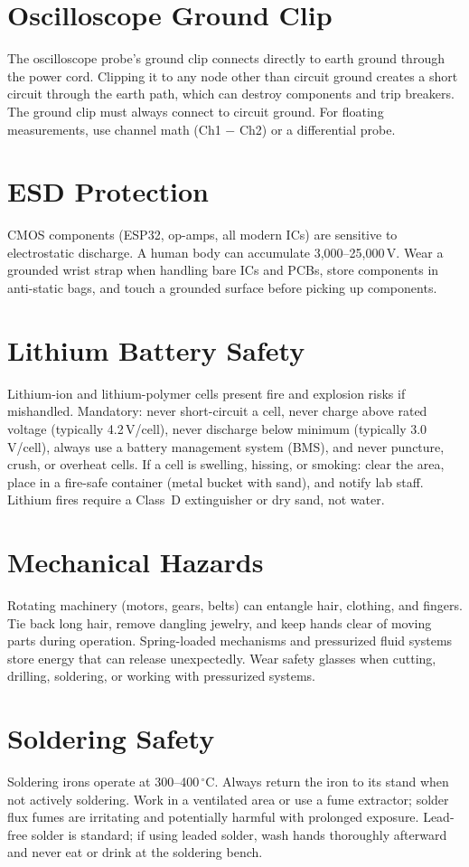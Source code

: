 \documentclass[11pt,letterpaper,twoside,openany]{book}
\newcommand{\degC}{\ensuremath{{}^{\circ}\text{C}}}
\begin{document}
\section*{Oscilloscope Ground Clip}
The oscilloscope probe's ground clip connects directly to earth ground through the power cord. Clipping it to any node other than circuit ground creates a short circuit through the earth path, which can destroy components and trip breakers. The ground clip must always connect to circuit ground. For floating measurements, use channel math (Ch1 $-$ Ch2) or a differential probe.

\section*{ESD Protection}
CMOS components (ESP32, op-amps, all modern ICs) are sensitive to electrostatic discharge. A human body can accumulate 3,000--25,000\,V. Wear a grounded wrist strap when handling bare ICs and PCBs, store components in anti-static bags, and touch a grounded surface before picking up components.

\section*{Lithium Battery Safety}
Lithium-ion and lithium-polymer cells present fire and explosion risks if mishandled. Mandatory: never short-circuit a cell, never charge above rated voltage (typically 4.2\,V/cell), never discharge below minimum (typically 3.0\,V/cell), always use a battery management system (BMS), and never puncture, crush, or overheat cells. If a cell is swelling, hissing, or smoking: clear the area, place in a fire-safe container (metal bucket with sand), and notify lab staff. Lithium fires require a Class~D extinguisher or dry sand, not water.

\section*{Mechanical Hazards}
Rotating machinery (motors, gears, belts) can entangle hair, clothing, and fingers. Tie back long hair, remove dangling jewelry, and keep hands clear of moving parts during operation. Spring-loaded mechanisms and pressurized fluid systems store energy that can release unexpectedly. Wear safety glasses when cutting, drilling, soldering, or working with pressurized systems.

\section*{Soldering Safety}
Soldering irons operate at 300--400\,\degC{}. Always return the iron to its stand when not actively soldering. Work in a ventilated area or use a fume extractor; solder flux fumes are irritating and potentially harmful with prolonged exposure. Lead-free solder is standard; if using leaded solder, wash hands thoroughly afterward and never eat or drink at the soldering bench.
\end{document}
